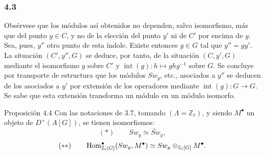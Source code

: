 \subsubsection*{4.3}

Obsérvese que los módulos así obtenidos no dependen, salvo isomorfismo, más que del punto $y\in C$, y no de la elección del punto $y'$ ni de $C'$ por encima de $y$. Sea, pues, $y''$ otro punto de esta índole. Existe entonces $g\in G$ tal que $y''=g y'$. La situación $(C',y'',G)$ se deduce, por tanto, de la situación $(C,y',G)$ mediante el isomorfismo $g$ sobre $C'$ y $\operatorname{int}(g):h\mapsto ghg^{-1}$ sobre $G$. Se concluye por transporte de estructura que los módulos $Sw_y$, etc., asociados a $y''$ se deducen de los asociados a $y'$ por extensión de los operadores mediante $\operatorname{int}(g):G\to G$. Se sabe que esta extensión transforma un módulo en un módulo isomorfo.

\begin{statement}{Proposición 4.4}
Con las notaciones de 3.7, tomando $(\Lambda=\mathbb Z_\ell)$, y siendo $M^\bullet$ un objeto de $D^+(A[G])$, se tienen isomorfismos:
\[
(*)\qquad Sw_y\simeq \check{Sw}_y,
\]
\[
(**)\qquad
\operatorname{Hom}^\bullet_{\mathbb Z_\ell[G]}(Sw_y,M^\bullet)
\simeq Sw_y\otimes_{\mathbb Z_\ell[G]}M^\bullet.
\]
\end{statement}

